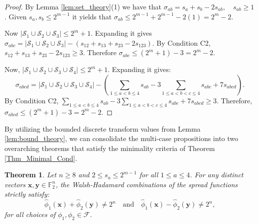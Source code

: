 \documentclass[pdflatex,sn-mathphys-num]{sn-jnl}%
\theoremstyle{thmstyleone}%
\newtheorem{theorem}{Theorem}%
\theoremstyle{thmstyletwo}%
\theoremstyle{thmstylethree}%
\begin{document}
\begin{proof}
By  Lemma \ref{lem:set_theory}(1) we have that  $\sigma_{ab} = s_a + s_b - 2s_{ab}, \quad s_{ab} \geq 1$. 
Given $s_a, s_b \leq 2^{m-1}$ it yields that $\sigma_{ab} \leq 2^{m-1} + 2^{m-1} - 2(1) = 2^m - 2$. 

Now $|\mathcal{S}_1 \cup \mathcal{S}_2 \cup \mathcal{S}_3| \leq 2^m + 1$. 
Expanding it gives  $\sigma_{abc} = |\mathcal{S}_1 \cup \mathcal{S}_2 \cup \mathcal{S}_3| - \left( s_{12} + s_{13} + s_{23} - 2s_{123} \right)$.
By Condition C2, $s_{12} + s_{13} + s_{23} - 2s_{123} \geq 3$. Therefore $\sigma_{abc} \leq (2^m + 1) - 3 = 2^m - 2$. 

Now, $|\mathcal{S}_1 \cup \mathcal{S}_2 \cup \mathcal{S}_3 \cup \mathcal{S}_4| \leq 2^m + 1$. Expanding it gives:
\[
\sigma_{abcd} = |\mathcal{S}_1 \cup \mathcal{S}_2 \cup \mathcal{S}_3 \cup \mathcal{S}_4| - \left( \sum_{1 \le a < b \le 4} s_{ab} - 3 \sum_{1 \le a < b < c \le 4} s_{abc} + 7 s_{abcd} \right).
\]
By Condition C2, $\sum_{1 \le a < b \le 4} s_{ab} - 3 \sum_{1 \le a < b < c \le 4} s_{abc} + 7 s_{abcd} \ge 3$. Therefore, $\sigma_{abcd} \le (2^m + 1) - 3 = 2^m - 2$.
\end{proof}



By utilizing the bounded discrete transform values from Lemma \ref{lem:bound_theory}, we can consolidate the multi-case propositions into two overarching theorems that satisfy the minimality criteria of Theorem \ref{Thm_Minimal_Cond}.




\begin{theorem}\label{Thm_Verify_Cond1}
Let $n \geq 8$ and $2 \leq s_a \leq 2^{m-1}$ for all $1 \leq a \leq 4$. For any distinct vectors $\mathbf{x}, \mathbf{y} \in \mathbb{F}_2^n$, the Walsh-Hadamard combinations of the spread functions strictly satisfy:
\[ \widehat{\phi}_1(\mathbf{x}) + \widehat{\phi}_2(\mathbf{y}) \neq 2^n \quad \text{and} \quad \widehat{\phi}_1(\mathbf{x}) - \widehat{\phi}_2(\mathbf{y}) \neq 2^n, \]
for all choices of $\phi_1, \phi_2 \in \mathcal{F}$.
\end{theorem}
\end{document}
